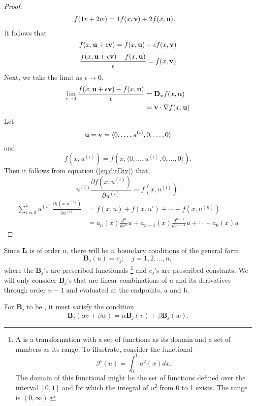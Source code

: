 \begin{proof}
\begin{equation}
\begin{split}
			f(1 v + 2 w)&= 1 f(x, \textbf{v}) + 2 f(x, \textbf{u}).
		\end{split}
	\end{equation}
	It follows that 
	\begin{equation}
		f(x, \textbf{u} + \epsilon \textbf{v}) = f(x, \textbf{u}) + \epsilon f(x, \textbf{v})
	\end{equation}
	\begin{equation}
		\frac{f(x, \textbf{u} + \epsilon \textbf{v})-f(x,\textbf{u})}{\epsilon} = f(x,\textbf{v})
	\end{equation}
	Next, we take the limit as \(\epsilon \to 0\). 
	\begin{equation}\label{eq:dirDiv}
		\begin{split}
			\lim_{\epsilon \to 0}\frac{f(x, \textbf{u} + \epsilon \textbf{v} )-f(x,\textbf{u} )}{\epsilon} &= \mathrm{\bf{D}}_{\textbf{v}} f(x,\textbf{u})\\
			&= \textbf{v} \cdot \nabla f(x,\textbf{u})
		\end{split}
	\end{equation}
	Let 
	\begin{equation}
		\textbf{u} = \textbf{v} = \langle 0, \dots, u^{(i)}, 0, \dots, 0 \rangle
	\end{equation}
	and
	\begin{equation}
		f(x,u^{(i)}) = f(x, \langle 0, \dots, u^{(i)}, 0, \dots, 0 \rangle ).
	\end{equation}
	Then it follows from equation (\ref{eq:dirDiv}) that,
	\begin{equation}
		u^{(i)}\frac{\partial f(x, u^{(i)})}{\partial u^{(i)}} = f(x,u^{(i)}).
	\end{equation}
	\begin{equation}
		\begin{split}
			\sum_{i=0}^{n} u^{(i)}\frac{\partial f(x, u^{(i)})}{\partial u^{(i)}} &= f(x,u) + f(x, u') + \cdots + f(x, u^{(n)})\\
			&= a_n(x) \frac{d^n}{dx^n}u + a_{n-1}(x) \frac{d^{n-1}}{dx^{n-1}}u + \cdots + a_0(x)u
		\end{split}
	\end{equation}
\end{proof}

	Since \(\mathrm{\bf{L}}\) is of order \(n\), there will be \(n\) boundary conditions of the general form 
\begin{equation}
	\mathbf{B}_j (u) = c_j;\quad j=1,2,\dots,n,
\end{equation}
where the \(\mathbf{B}_j\)'s are prescribed functionals \footnote{A  is a transformation with a set of functions as its domain and a set of numbers as its range. To illustrate, consider the functional 
\begin{equation}
	\mathcal{F}(u) = \int_{0}^{1} u^2(x)dx.
\end{equation}
The domain of this functional might be the set of functions defined over the interval \([0,1]\) and for which the integral of \(u^2\) from 0 to 1 exists. The range is \((0, \infty)\).
} and \(c_j\)'s are prescribed constants. We will only consider \(\mathbf{B}_j\)'s that are linear combinations of \(u\) and its derivatives through order \(n-1\) and evaluated at the endpoints, a and b. 

For \(\mathbf{B}_j\) to be , it must satisfy the condition
\begin{equation}
	\mathbf{B}_j(\alpha v + \beta w) = \alpha \mathbf{B}_j (v) + \beta \mathbf{B}_j(w).
\end{equation}